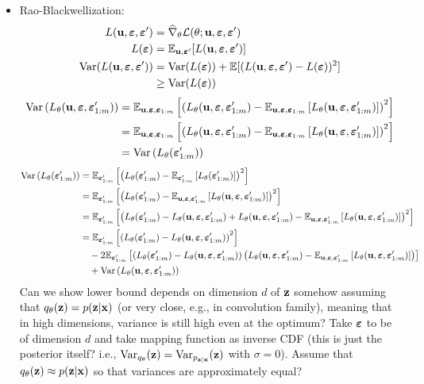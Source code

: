 \documentclass[10pt]{article}
\begin{document}
\begin{itemize}
\item
Rao-Blackwellization:
\begin{align*}
L(\mathbf{u},\bm{\varepsilon},\bm{\varepsilon}') &= \widehat{\nabla}_\theta\mathcal{L}(\theta;\mathbf{u},\bm{\varepsilon},\bm{\varepsilon}') \\
L(\bm{\varepsilon}) &= \mathbb{E}_{\mathbf{u},\bm{\varepsilon}'}[L(\mathbf{u},\bm{\varepsilon},\bm{\varepsilon}')] \\
\mathrm{Var}(L(\mathbf{u},\bm{\varepsilon},\bm{\varepsilon}')) &= \mathrm{Var}(L(\bm{\varepsilon})) + \mathbb{E}[(L(\mathbf{u},\bm{\varepsilon},\bm{\varepsilon}')-L(\bm{\varepsilon}))^2] \\
& \geq \mathrm{Var}(L(\bm{\varepsilon}))
\end{align*}
\begin{align*}
\mathrm{Var}\left(L_\theta(\mathbf{u},\bm{\varepsilon},\bm{\varepsilon}_{1:m}')\right) &= \mathbb{E}_{\mathbf{u},\bm{\varepsilon},\bm{\varepsilon}_{1:m}}\left[\left(L_\theta(\mathbf{u},\bm{\varepsilon},\bm{\varepsilon}_{1:m}') - \mathbb{E}_{\mathbf{u},\bm{\varepsilon},\bm{\varepsilon}_{1:m}}\left[L_\theta(\mathbf{u},\bm{\varepsilon},\bm{\varepsilon}_{1:m}')\right]\right)^2\right] \\
&= \mathbb{E}_{\mathbf{u},\bm{\varepsilon},\bm{\varepsilon}_{1:m}}\left[\left(L_\theta(\mathbf{u},\bm{\varepsilon},\bm{\varepsilon}_{1:m}') - \mathbb{E}_{\mathbf{u},\bm{\varepsilon},\bm{\varepsilon}_{1:m}}\left[L_\theta(\mathbf{u},\bm{\varepsilon},\bm{\varepsilon}_{1:m}')\right]\right)^2\right] \\
&= \mathrm{Var}\left(L_\theta(\bm{\varepsilon}_{1:m}')\right)
\end{align*}
\begin{align*}
\mathrm{Var}\left(L_\theta(\bm{\varepsilon}_{1:m}')\right) &= \mathbb{E}_{\bm{\varepsilon}_{1:m}'}\left[\left(L_\theta(\bm{\varepsilon}_{1:m}')-\mathbb{E}_{\bm{\varepsilon}_{1:m}'}\left[L_\theta(\bm{\varepsilon}_{1:m}')\right]\right)^2\right] \\
&= \mathbb{E}_{\bm{\varepsilon}_{1:m}'}\left[\left(L_\theta(\bm{\varepsilon}_{1:m}')-\mathbb{E}_{\mathbf{u},\bm{\varepsilon},\bm{\varepsilon}_{1:m}'}\left[L_\theta(\mathbf{u},\bm{\varepsilon},\bm{\varepsilon}_{1:m}')\right]\right)^2\right] \\
&= \mathbb{E}_{\bm{\varepsilon}_{1:m}'}\left[\left(L_\theta(\bm{\varepsilon}_{1:m}')-L_\theta(\mathbf{u},\bm{\varepsilon},\bm{\varepsilon}_{1:m}')+L_\theta(\mathbf{u},\bm{\varepsilon},\bm{\varepsilon}_{1:m}')-\mathbb{E}_{\mathbf{u},\bm{\varepsilon},\bm{\varepsilon}_{1:m}'}\left[L_\theta(\mathbf{u},\bm{\varepsilon},\bm{\varepsilon}_{1:m}')\right]\right)^2\right] \\
&= \mathbb{E}_{\bm{\varepsilon}_{1:m}'}\left[\left(L_\theta(\bm{\varepsilon}_{1:m}')-L_\theta(\mathbf{u},\bm{\varepsilon},\bm{\varepsilon}_{1:m}')\right)^2\right] \\
&\quad - 2\mathbb{E}_{\bm{\varepsilon}_{1:m}'}\left[\left(L_\theta(\bm{\varepsilon}_{1:m}')-L_\theta(\mathbf{u},\bm{\varepsilon},\bm{\varepsilon}_{1:m}')\right)\left(L_\theta(\mathbf{u},\bm{\varepsilon},\bm{\varepsilon}_{1:m}')-\mathbb{E}_{\mathbf{u},\bm{\varepsilon},\bm{\varepsilon}_{1:m}'}\left[L_\theta(\mathbf{u},\bm{\varepsilon},\bm{\varepsilon}_{1:m}')\right]\right)\right] \\
&\quad + \mathrm{Var}\left(L_\theta(\mathbf{u},\bm{\varepsilon},\bm{\varepsilon}_{1:m}')\right)
\end{align*}
\todo Can we show lower bound depends on dimension $d$ of $\mathbf{z}$ somehow assuming that $q_\theta(\mathbf{z})=p(\mathbf{z}|\mathbf{x})$ (or very close, e.g., in convolution family), meaning that in high dimensions, variance is still high even at the optimum? Take $\bm{\varepsilon}$ to be of dimension $d$ and take mapping function as inverse CDF (this is just the posterior itself? i.e., $\mathrm{Var}_{q_\theta}(\mathbf{z})=\mathrm{Var}_{p_{\mathbf{z}|\mathbf{x}}}(\mathbf{z})$ with $\sigma=0$). Assume that $q_\theta(\mathbf{z})\approx p(\mathbf{z}|\mathbf{x})$ so that variances are approximately equal?


\end{itemize}
\end{document}
